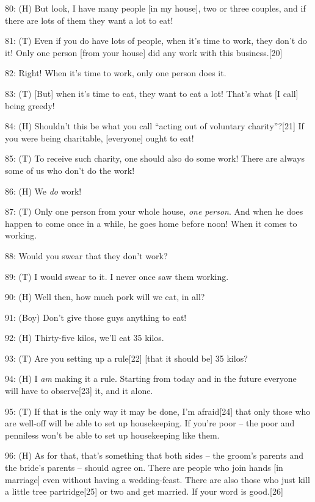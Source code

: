 {80: (H) But look, I have many people [in my house], two or three couples,
and if there are lots of them they want a lot to eat!}

{81: (T) Even if you do have lots of people, when it's time to work, they
don't do it! Only one person [from your house] did any work with this business.[20]}

{82: Right! When it's time to work, only one person does it. }

{83: (T) [But] when it's time to eat, they want to eat a lot! That's what
[I call] being greedy! }

{84: (H) Shouldn't this be what you call ``acting out of voluntary
charity''?[21] If you were being charitable, [everyone] ought to eat!}

{85: (T) To receive such charity, one should also do some work! There are
always some of us who don't do the work! }

{86: (H) We }{\textit{do }}{work!}

{87: (T) Only one person from your whole house, }{\textit{one person}}{.
And when he does happen to come once in a while, he goes home before noon! When
it comes to working. }

{88: Would you swear that they don't work?}

{89: (T) I would swear to it. I never once saw them working.}

{90: (H) Well then, how much pork will we eat, in all? }

{91: (Boy) Don't give those guys anything to eat!}

{92: (H) Thirty-five kilos, we'll eat 35 kilos.}

{93: (T) Are you setting up a rule[22] [that it should be] 35 kilos?}

{94: (H) I }{\textit{am}}{ making it a rule. Starting from
today and in the future everyone will have to observe[23] it, and it alone.}

{95: (T) If that is the only way it may be done, I'm afraid[24] that only
those who are well-off will be able to set up housekeeping. If you're poor -- the
poor and penniless won't be able to set up housekeeping like them. }

{96: (H) As for that, that's something that both sides -- the groom's parents
and the bride's parents -- should agree on. There are people who join hands [in
marriage] even without having a wedding-feast. There are also those who just kill
a little tree partridge[25] or two and get married. If your word is good.[26]}

